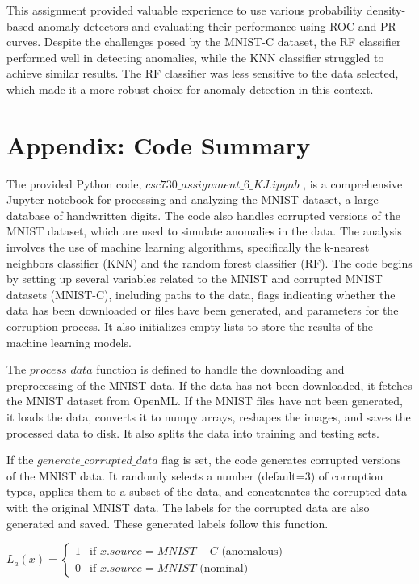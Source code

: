 This assignment provided valuable experience to use various probability density-based anomaly detectors and evaluating their performance using ROC and PR curves.
Despite the challenges posed by the MNIST-C dataset, the RF classifier performed well in detecting anomalies, while the KNN classifier struggled to achieve similar results. 
The RF classifier was less sensitive to the data selected, which made it a more robust choice for anomaly detection in this context.   


\section{Appendix: Code Summary}





The provided Python code, $csc730\_assignment\_6\_KJ.ipynb$ ,  is a comprehensive Jupyter notebook for processing and analyzing the MNIST dataset, a large database of handwritten digits. The code also handles corrupted versions of the MNIST dataset, which are used to simulate anomalies in the data. 
The analysis involves the use of machine learning algorithms, specifically the k-nearest neighbors classifier (KNN) and the random forest classifier (RF).
The code begins by setting up several variables related to the MNIST and corrupted MNIST datasets (MNIST-C), including paths to the data, flags indicating whether the data has been downloaded or files have been generated, and parameters for the corruption process. 
It also initializes empty lists to store the results of the machine learning models.\par

The $process\_data$ function is defined to handle the downloading and preprocessing of the MNIST data. 
If the data has not been downloaded, it fetches the MNIST dataset from OpenML. 
If the MNIST files have not been generated, it loads the data, converts it to numpy arrays, reshapes the images, and saves the processed data to disk. 
It also splits the data into training and testing sets.\par

If the $generate\_corrupted\_data$ flag is set, the code generates corrupted versions of the MNIST data.
It randomly selects a number (default=3) of corruption types, applies them to a subset of the data, and concatenates the corrupted data with the original MNIST data. 
The labels for the corrupted data are also generated and saved. These generated labels follow this function.\par
$L_a(x) = 
\begin{cases} 
1 & \text{if } x.source = MNIST-C \text{ (anomalous)} \\
0 & \text{if } x.source = MNIST \text{ (nominal)}
\end{cases}$ \par


